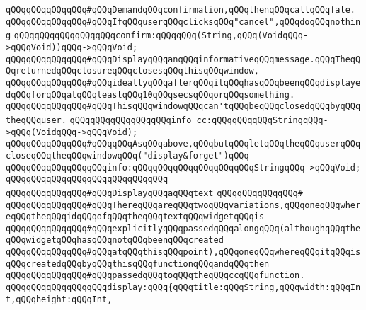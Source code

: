 \newline
\verb|qQQqqQQqqQQqqQQq#qQQqDemandqQQqconfirmation,qQQqthenqQQqcallqQQqfate.|\newline
\verb|qQQqqQQqqQQqqQQq#qQQqIfqQQquserqQQqclicksqQQq"cancel",qQQqdoqQQqnothing|\newline
\verb|qQQqqQQqqQQqqQQqqQQqconfirm:qQQqqQQq(String,qQQq(VoidqQQq->qQQqVoid))qQQq->qQQqVoid;|\newline
\newline
\verb|qQQqqQQqqQQqqQQq#qQQqDisplayqQQqanqQQqinformativeqQQqmessage.qQQqTheqQQqreturnedqQQqclosureqQQqclosesqQQqthisqQQqwindow,|\newline
\verb|qQQqqQQqqQQqqQQq#qQQqideallyqQQqafterqQQqitqQQqhasqQQqbeenqQQqdisplayedqQQqforqQQqatqQQqleastqQQq10qQQqsecsqQQqorqQQqsomething.|\newline
\verb|qQQqqQQqqQQqqQQq#qQQqThisqQQqwindowqQQqcan'tqQQqbeqQQqclosedqQQqbyqQQqtheqQQquser.|\newline
\newline
\verb|qQQqqQQqqQQqqQQqqQQqinfo_cc:qQQqqQQqqQQqStringqQQq->qQQq(VoidqQQq->qQQqVoid);|\newline
\newline
\verb|qQQqqQQqqQQqqQQq#qQQqqQQqAsqQQqabove,qQQqbutqQQqletqQQqtheqQQquserqQQqcloseqQQqtheqQQqwindowqQQq("display&forget")qQQq|\newline
\verb|qQQqqQQqqQQqqQQqqQQqinfo:qQQqqQQqqQQqqQQqqQQqqQQqStringqQQq->qQQqVoid;|\newline
\verb|qQQqqQQqqQQqqQQqqQQqqQQqqQQqqQQq|\newline
\verb|qQQqqQQqqQQqqQQq#qQQqDisplayqQQqaqQQqtext|\newline
\verb|qQQqqQQqqQQqqQQq#|\newline
\verb|qQQqqQQqqQQqqQQq#qQQqThereqQQqareqQQqtwoqQQqvariations,qQQqoneqQQqwhereqQQqtheqQQqidqQQqofqQQqtheqQQqtextqQQqwidgetqQQqis|\newline
\verb|qQQqqQQqqQQqqQQq#qQQqexplicitlyqQQqpassedqQQqalongqQQq(althoughqQQqtheqQQqwidgetqQQqhasqQQqnotqQQqbeenqQQqcreated|\newline
\verb|qQQqqQQqqQQqqQQq#qQQqatqQQqthisqQQqpoint),qQQqoneqQQqwhereqQQqitqQQqisqQQqcreatedqQQqbyqQQqthisqQQqfunctionqQQqandqQQqthen|\newline
\verb|qQQqqQQqqQQqqQQq#qQQqpassedqQQqtoqQQqtheqQQqccqQQqfunction.|\newline
\newline
\verb|qQQqqQQqqQQqqQQqqQQqdisplay:qQQq{qQQqtitle:qQQqString,qQQqwidth:qQQqInt,qQQqheight:qQQqInt,|\newline

